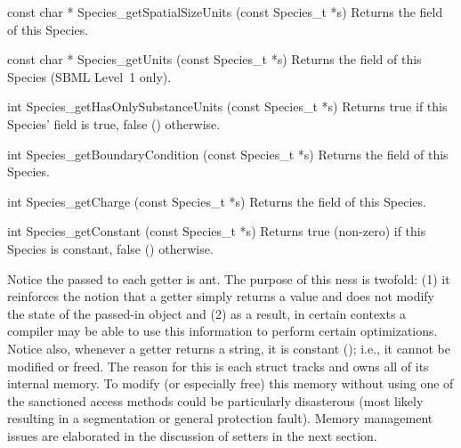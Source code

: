 \documentclass{sbmlmanual}
\begin{document}
\begin{methoddef}{const char * Species\_getSpatialSizeUnits (const Species\_t *s)}
  Returns the  field of this Species.
\end{methoddef}


\begin{methoddef}{const char * Species\_getUnits (const Species\_t *s)}
  Returns the  field of this Species (SBML Level~1 only).
\end{methoddef}


\begin{methoddef}{int Species\_getHasOnlySubstanceUnits (const Species\_t *s)}
  Returns true if this Species' 
  field is true, false () otherwise.
\end{methoddef}


\begin{methoddef}{int Species\_getBoundaryCondition (const Species\_t *s)}
  Returns the  field of this Species.
\end{methoddef}


\begin{methoddef}{int Species\_getCharge (const Species\_t *s)}
  Returns the  field of this Species.
\end{methoddef}


\begin{methoddef}{int Species\_getConstant (const Species\_t *s)}
  Returns true (non-zero) if this Species is constant, false ()
  otherwise.
\end{methoddef}


Notice the  passed to each getter is ant.
The purpose of this ness is twofold: (1) it reinforces the
notion that a getter simply returns a value and does not modify the state
of the passed-in object and (2) as a result, in certain contexts a compiler
may be able to use this information to perform certain optimizations.
Notice also, whenever a getter returns a string, it is constant
(); i.e., it cannot be modified or freed.  The reason
for this is each struct tracks and owns all of its internal memory.  To
modify (or especially free) this memory without using one of the sanctioned
access methods could be particularly disasterous (most likely resulting in
a segmentation or general protection fault).  Memory management issues are
elaborated in the discussion of setters in the next section.
\end{document}
